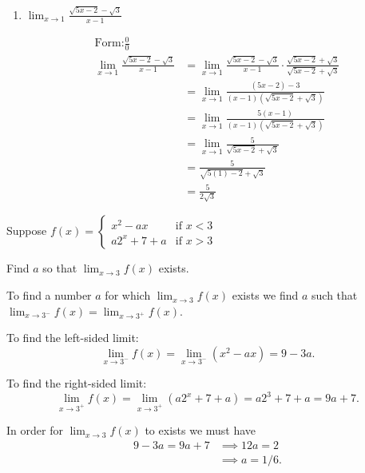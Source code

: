 \documentclass[nooutcomes]{ximera}
\begin{document}
\begin{problem}
\begin{enumerate}
	
	\item  $ \lim_{x \to 1} \frac{\sqrt{5x-2} - \sqrt{3}}{x-1} $
	\begin{freeResponse}
	\begin{align*}
	\text{Form:} \frac{0}{0}\\
	\lim_{x \to 1} \frac{\sqrt{5x-2} - \sqrt{3}}{x-1} &= \lim_{x \to 1} \frac{\sqrt{5x-2} - \sqrt{3}}{x-1} \cdot \frac{\sqrt{5x-2} + \sqrt{3}}{\sqrt{5x-2} + \sqrt{3}} \\
	&= \lim_{x \to 1} \frac{(5x-2)-3}{(x-1)(\sqrt{5x-2} + \sqrt{3})} \\
	&= \lim_{x \to 1} \frac{5(x-1)}{(x-1)(\sqrt{5x-2} + \sqrt{3})} \\
	&= \lim_{x \to 1} \frac{5}{\sqrt{5x-2} + \sqrt{3}} \\
	&=   \frac{5}{\sqrt{5(1)-2} + \sqrt{3}} \\
	&= \frac{5}{2 \sqrt{3}} 
	\end{align*}
	\end{freeResponse}
	\end{enumerate}
\end{problem}
	
	
	
	
			
			

\begin{problem}
Suppose
	$f(x) =   \left\{ \begin{array}{lr}
	x^2 - ax 	&	\text{if } x < 3	\\
	a2^x + 7 + a	&	\text{if } x > 3	\end{array} \right.  $
	
	Find $a$ so that $ \lim_{x \to 3} f(x)  $ exists.
	\begin{freeResponse}
	 To find a number $a$ for which $\lim_{x \to 3} f(x)$ exists we find $a$ such that $\lim_{x \to 3^-} f(x) = \lim_{x \to 3^+} f(x)$.

    To find the left-sided limit:
    \[
      \lim_{x \to 3^-} f(x) = \lim_{x \to 3^-} (x^2 - ax) = 9 - 3a.
    \]
  
    To find the right-sided limit:
    \[
      \lim_{x \to 3^+} f(x) = \lim_{x \to 3^+} (a2^x + 7 + a) = a2^3 + 7 + a = 9a + 7.
    \]

    In order for $\lim_{x \to 3} f(x)$ to exists we must have
    \begin{align*}
      9 - 3a = 9a + 7 &\implies 12a = 2\\
                      &\implies a = 1/6.
    \end{align*}
	\end{freeResponse}
\end{problem}
	
\end{document}
